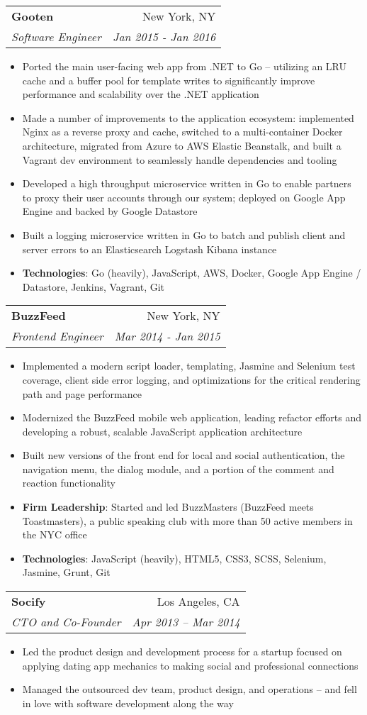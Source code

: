 \documentclass[letterpaper,11pt]{article}
\makeatletter
\newcommand{\resumeItem}[2]{
  \item\small{
    \textbf{#1}{: #2 \vspace{-1.5pt}}
  }
}
\newcommand{\resumeItemSimple}[1]{
  \item\small{
    {#1 \vspace{-1.5pt}}
  }
}
\newcommand{\resumeSubheading}[4]{
  \vspace{-1pt}\item
    \begin{tabular*}{0.97\textwidth}[t]{l@{\extracolsep{\fill}}r}
      \textbf{#1} & #2 \\
      \textit{\small#3} & \textit{\small #4} \\
    \end{tabular*}\vspace{-5pt}
}
\newcommand{\resumeItemListStart}{\begin{itemize}}
\newcommand{\resumeItemListEnd}{\end{itemize}\vspace{-5pt}}
\makeatother
\begin{document}
    \resumeSubheading
      {Gooten}{New York, NY}
      {Software Engineer}{Jan 2015 - Jan 2016}
      \resumeItemListStart
        \resumeItemSimple
          {Ported the main user-facing web app from .NET to Go -- utilizing an LRU cache and a buffer pool for template writes to significantly improve performance and scalability over the .NET application}
        \resumeItemSimple
          {Made a number of improvements to the application ecosystem: implemented Nginx as a reverse proxy and cache, switched to a multi-container Docker architecture, migrated from Azure to AWS Elastic Beanstalk, and built a Vagrant dev environment to seamlessly handle dependencies and tooling}
        \resumeItemSimple
          {Developed a high throughput microservice written in Go to enable partners to proxy their user accounts through our system; deployed on Google App Engine and backed by Google Datastore}
        \resumeItemSimple
          {Built a logging microservice written in Go to batch and publish client and server errors to an Elasticsearch Logstash Kibana instance}
        \resumeItem{Technologies}
        {Go (heavily), JavaScript, AWS, Docker, Google App Engine / Datastore, Jenkins, Vagrant, Git}
      \resumeItemListEnd

    \resumeSubheading
      {BuzzFeed}{New York, NY}
      {Frontend Engineer}{Mar 2014 - Jan 2015}
      \resumeItemListStart
        \resumeItemSimple
          {Implemented a modern script loader, templating, Jasmine and Selenium test coverage, client side error logging, and optimizations for the critical rendering path and page performance}
        \resumeItemSimple
          {Modernized the BuzzFeed mobile web application, leading refactor efforts and developing a robust, scalable JavaScript application architecture}
        \resumeItemSimple
          {Built new versions of the front end for local and social authentication, the navigation menu, the dialog module, and a portion of the comment and reaction functionality}
        \resumeItem{Firm Leadership}
          {Started and led BuzzMasters (BuzzFeed meets Toastmasters), a public speaking club with more than 50 active members in the NYC office}
        \resumeItem{Technologies}
        {JavaScript (heavily), HTML5, CSS3, SCSS, Selenium, Jasmine, Grunt, Git}
      \resumeItemListEnd
      
    \resumeSubheading
      {Socify}{Los Angeles, CA}
      {CTO and Co-Founder}{Apr 2013 – Mar 2014}
      \resumeItemListStart
        \resumeItemSimple
          {Led the product design and development process for a startup focused on applying dating app mechanics to making social and professional connections}
        \resumeItemSimple
          {Managed the outsourced dev team, product design, and operations -- and fell in love with software development along the way}
      \resumeItemListEnd
\end{document}
